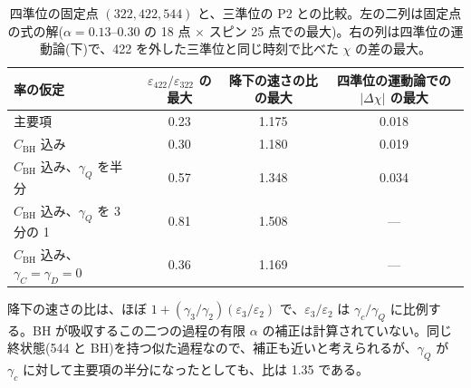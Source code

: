 \begin{table}[H]
\centering\small
\begin{tabular}{lccc}
\toprule
率の仮定 & $\varepsilon_{422}/\varepsilon_{322}$ の最大 & 降下の速さの比の最大 & 四準位の運動論での $|\Delta\chi|$ の最大\\
\midrule
主要項 & 0.23 & 1.175 & 0.018\\
$C_\mathrm{BH}$ 込み & 0.30 & 1.180 & 0.019\\
$C_\mathrm{BH}$ 込み、$\gamma_Q$ を半分 & 0.57 & 1.348 & 0.034\\
$C_\mathrm{BH}$ 込み、$\gamma_Q$ を 3 分の 1 & 0.81 & 1.508 & ---\\
$C_\mathrm{BH}$ 込み、$\gamma_C=\gamma_D=0$ & 0.36 & 1.169 & ---\\
\bottomrule
\end{tabular}
\caption{四準位の固定点 $(322,422,544)$ と、三準位の P2 との比較。左の二列は固定点の式の解($\alpha=0.13$--0.30 の 18 点 $\times$ スピン 25 点での最大)。右の列は四準位の運動論(下)で、422 を外した三準位と同じ時刻で比べた $\chi$ の差の最大。}
\label{tab:e21fp4}
\end{table}

降下の速さの比は、ほぼ $1+(\gamma_3/\gamma_2)(\varepsilon_3/\varepsilon_2)$ で、$\varepsilon_3/\varepsilon_2$ は $\gamma_c/\gamma_Q$ に比例する。BH が吸収するこの二つの過程の有限 $\alpha$ の補正は計算されていない。同じ終状態(544 と BH)を持つ似た過程なので、補正も近いと考えられるが、$\gamma_Q$ が $\gamma_c$ に対して主要項の半分になったとしても、比は 1.35 である。

